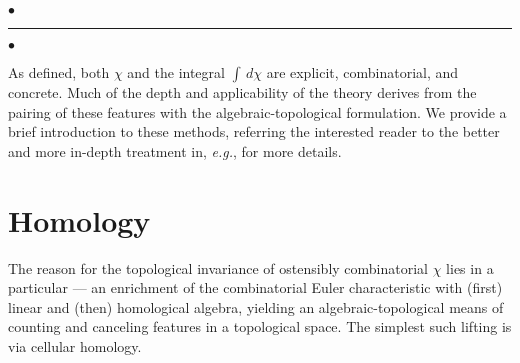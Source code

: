 \documentclass{psapm-l}
\theoremstyle{definition}
\theoremstyle{remark}
\numberwithin{equation}{section}
\begin{document}
{
\begin{center}
\nointerlineskip\vspace{-0.04in}
        $\bullet$\hfill\rule{0.77\linewidth}{1.0pt}\hfill$\bullet$
\par\nointerlineskip\vspace{-0.01in}
\end{center}
}
\vspace{0.1in}

As defined, both $\chi$ and the integral $\int\,d\chi$ are explicit, combinatorial, and concrete. Much of the depth and applicability of the theory derives from the pairing of these features with the algebraic-topological formulation. We provide a brief introduction to these methods, referring the interested reader to the better and more in-depth treatment in, {{\em e.g.}}, \cite{Hatcher} for more details.

\section{Homology}
\label{sec:hom}

The reason for the topological invariance of ostensibly combinatorial $\chi$ lies in a particular {{}} ---  an enrichment of the combinatorial Euler characteristic with (first) linear and (then) homological algebra, yielding an algebraic-topological means of counting and canceling features in a topological space. The simplest such lifting is via cellular homology.
\end{document}
